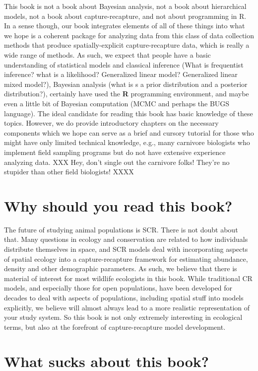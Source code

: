 This book is not a book about Bayesian analysis, not a book about
hierarchical models, not a book about capture-recapture, and not about
programming in R. In a sense though, our book integrates elements of
all of these things into what we hope is a coherent package for
analyzing data from this class of data collection methods
that produce spatially-explicit capture-recapture data, which is really a wide range of methods.   As such, we
expect that people have a basic understanding of statistical models
and classical inference (What is frequentist inference? what is a
likelihood? Generalized linear model? Generalized linear mixed
model?), 
 Bayesian analysis (what is s a prior distribution and a
posterior distribution?),
certainly have used the {\bf R} programming environment,
and maybe even a little bit
of Bayesian
computation (MCMC and perhaps the BUGS language).
The ideal candidate for reading this book has basic knowledge of these
topics. However, we do provide introductory chapters on the necessary
components which we hope can serve as a brief and cursory tutorial for
those who might have only limited technical knowledge, e.g., many
carnivore biologists who implement field sampling programs but do not
have extensive experience analyzing data.
XXX Hey, don't single out the carnivore folks! They're no stupider than other field biologists! XXXX

\section*{Why should you read this book?}

The future of studying animal populations is SCR. There is not doubt
about that. Many questions in ecology and conservation are related to how individuals distribute themselves in space, and SCR models deal with incorporating aspects of spatial ecology into a capture-recapture framework for estimating abundance, density and other demographic parameters. As such, we believe that there is material of interest for most wildlife ecologists in this book. While traditional CR models, and especially those for open populations, have been developed for decades to deal with aspects of populations, including spatial stuff into models explicitly, we believe will almost always lead to a more realistic representation of your study system.  So this book is not only extremely interesting in ecological terms, but also at the forefront of capture-recapture model development.

\section{What sucks about this book?}

